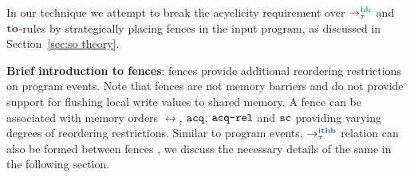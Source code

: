 
%

In our technique we attempt to break the acyclicity requirement over
$\setHB$ and $\lto$-rules by strategically placing \cc fences in 
the input program, as discussed in Section~\ref{sec:so theory}.

\noindent
{\bf Brief introduction to \cc fences}: 
\cc fences provide additional reordering restrictions on program 
events. Note that \cc fences are not memory barriers and do not
provide support for flushing local write values to shared memory.
%
A fence can be associated with memory orders $\rel$, $\acq$, 
$\acqrel$ and $\sc$
providing varying degrees of reordering restrictions.
%
Similar to program events, $\setITHB$ relation can also be formed 
between \cc fences 
\cite{batty2011mathematizing}\cite{C11}, we discuss the necessary
details of the same in the following section.
